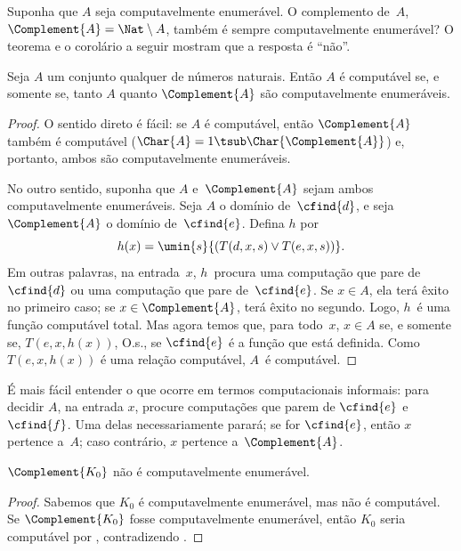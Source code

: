 \documentclass[../../../include/open-logic-section]{subfiles}
\begin{document}

Suponha que $A$ seja computavelmente enumerável. O complemento de~$A$,
$\Complement{A} = \Nat \setminus A$, também é sempre computavelmente
enumerável? O teorema e o corolário a seguir mostram que a resposta é
``não''.

\begin{thm}
Seja $A$ um conjunto qualquer de números naturais. Então $A$ é
computável se, e somente se, tanto $A$ quanto $\Complement{A}$ são
computavelmente enumeráveis.
\end{thm}

\begin{proof}
O sentido direto é fácil: se $A$ é computável, então
$\Complement{A}$ também é computável ($\Char{A} = 1 \tsub
\Char{\Complement{A}}$) e, portanto, ambos são computavelmente
enumeráveis.

No outro sentido, suponha que $A$ e~$\Complement{A}$ sejam ambos
computavelmente enumeráveis. Seja $A$ o domínio de~$\cfind{d}$, e seja
$\Complement{A}$ o domínio de~$\cfind{e}$. Defina $h$ por
\[
h(x) = \umin{s}{(T(d,x,s) \lor T(e,x,s))}.
\]
Em outras palavras, na entrada~$x$, $h$~procura uma computação que pare
de~$\cfind{d}$ ou uma computação que pare de~$\cfind{e}$. Se
$x \in A$, ela terá êxito no primeiro caso; se
$x \in \Complement{A}$, terá êxito no segundo. Logo, $h$~é uma função
computável total. Mas agora temos que, para todo~$x$, $x \in A$ se, e
somente se, $T(e, x, h(x))$, O.s.\@, se $\cfind{e}$ é a função que
está definida. Como $T(e, x, h(x))$ é uma relação computável,
$A$~é computável.
\end{proof}

\begin{explain}
É mais fácil entender o que ocorre em termos computacionais informais:
para decidir $A$, na entrada $x$, procure computações que parem de
$\cfind{e}$ e $\cfind{f}$. Uma delas necessariamente parará; se for
$\cfind{e}$, então $x$ pertence a~$A$; caso contrário, $x$ pertence
a~$\Complement{A}$.
\end{explain}

\begin{cor}
$\Complement{K_0}$ não é computavelmente enumerável.
\end{cor}

\begin{proof}
Sabemos que $K_0$ é computavelmente enumerável, mas não é computável.
Se $\Complement{K_0}$ fosse computavelmente enumerável, então $K_0$
seria computável por , contradizendo
.
\end{proof}
\end{document}
